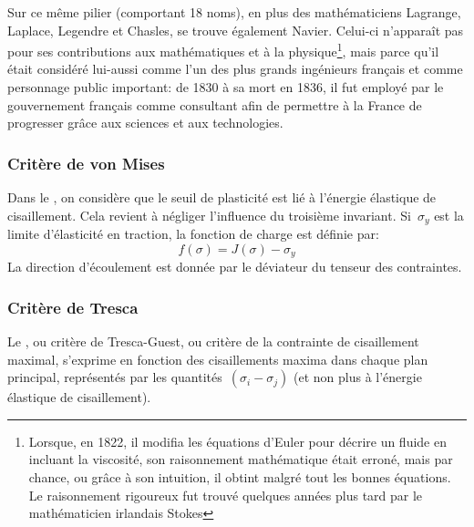 \begin{histoire}
\medskip
Sur ce même pilier (comportant 18 noms), en plus des mathématiciens Lagrange,
Laplace, Legendre
et Chasles, se trouve
également Navier.
Celui-ci n'apparaît pas pour ses contributions aux mathématiques et à la physique\footnote{%
Lorsque, en 1822, il modifia les équations d'Euler pour décrire un fluide en incluant la viscosité, son raisonnement
mathématique était erroné, mais par chance, ou grâce à son intuition, il obtint malgré tout les bonnes
équations. Le raisonnement rigoureux fut trouvé quelques années plus tard par le mathématicien irlandais
Stokes}, mais
parce qu'il était considéré lui-aussi comme l'un des plus grands ingénieurs français et comme personnage
public important: de 1830 à sa mort en 1836, il fut employé par le gouvernement français comme consultant
afin de permettre à la France de progresser grâce aux sciences et aux technologies.
\end{histoire}


\medskip
\subsubsection{Critère de von Mises}

Dans le ,
on considère que le seuil de plasticité est lié à l'énergie élastique de
cisaillement. Cela revient à négliger l'influence du troisième invariant.
Si~$\sigma_y$ est la limite d'élasticité en traction, la fonction de charge est définie par:
\begin{equation} f(\sigma) = J(\sigma) - \sigma_y \end{equation}
La direction d'écoulement est donnée par le déviateur du tenseur des contraintes.

\medskip
\subsubsection{Critère de Tresca}
Le , 
ou critère de Tresca-Guest, ou critère de la contrainte de
cisaillement maximal, s'exprime en fonction des cisaillements maxima dans chaque plan principal, représentés
par les quantités~$(\sigma_i-\sigma_j)$ (et non plus à l'énergie élastique de cisaillement).

